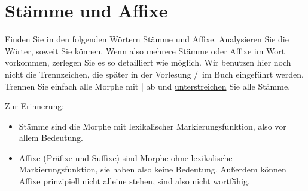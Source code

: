 \section{Stämme und Affixe}\label{sec:form}

Finden Sie in den folgenden Wörtern Stämme und Affixe.
Analysieren Sie die Wörter, soweit Sie können.
Wenn also mehrere Stämme oder Affixe im Wort vorkommen, zerlegen Sie es so detailliert wie möglich.
Wir benutzen hier noch nicht die Trennzeichen, die später in der Vorlesung \slash\ im Buch eingeführt werden.
Trennen Sie einfach alle Morphe mit | ab und \ul{unterstreichen} Sie alle Stämme.

Zur Erinnerung:

\begin{itemize}\Lf
  \item Stämme sind die Morphe mit lexikalischer Markierungsfunktion, also vor allem Bedeutung.
  \item Affixe (Präfixe und Suffixe) sind Morphe ohne lexikalische Markierungsfunktion, sie haben also keine Bedeutung.
    Außerdem können Affixe prinzipiell nicht alleine stehen, sind also nicht wortfähig.
\end{itemize}

